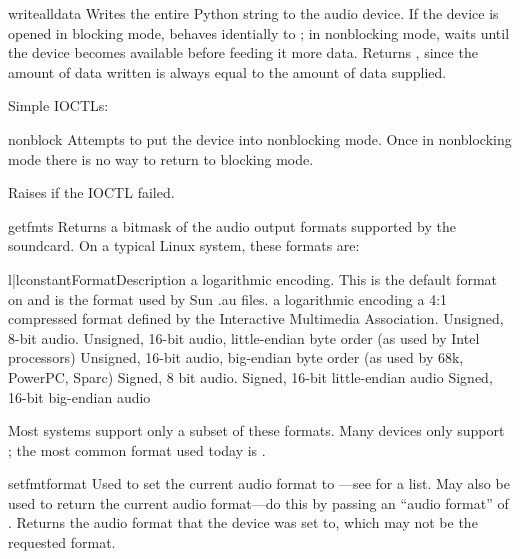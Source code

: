 \begin{methoddesc}{writeall}{data}
Writes the entire Python string  to the audio device.  If the
device is opened in blocking mode, behaves identially to
; in nonblocking mode, waits until the device becomes
available before feeding it more data.  Returns , since the
amount of data written is always equal to the amount of data supplied.
\end{methoddesc}

Simple IOCTLs:

\begin{methoddesc}{nonblock}{}
Attempts to put the device into nonblocking mode.  Once in nonblocking
mode there is no way to return to blocking mode.

Raises  if the IOCTL failed.
\end{methoddesc}

\begin{methoddesc}{getfmts}{}
Returns a bitmask of the audio output formats supported by the
soundcard.  On a typical Linux system, these formats are:

\begin{tableii}{l|l}{constant}{Format}{Description}
       {a logarithmic encoding.  This is the default format on
         and is the format used by Sun .au files.}
       {a logarithmic encoding}
       {a 4:1 compressed format defined by the Interactive Multimedia
        Association.} 
       {Unsigned, 8-bit audio.}
       {Unsigned, 16-bit audio, little-endian byte order (as used by
        Intel processors)}
       {Unsigned, 16-bit audio, big-endian byte order (as used by 68k,
        PowerPC, Sparc)}
       {Signed, 8 bit audio.}
       {Signed, 16-bit little-endian audio}
       {Signed, 16-bit big-endian audio}
\end{tableii}
Most systems support only a subset of these formats.  Many devices only
support ; the most common format used today is
.
\end{methoddesc}

\begin{methoddesc}{setfmt}{format}
Used to set the current audio format to ---see
 for a list.  May also be used to return the current
audio format---do this by passing an ``audio format'' of
. Returns the audio format that the device was set
to, which may not be the requested format.
\end{methoddesc}

